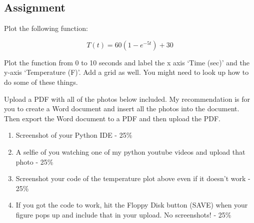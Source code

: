 \subsection{Assignment}

Plot the following function: 

\begin{equation}
  T(t) = 60(1-e^{-5t})+30
\end{equation}

Plot the function from 0 to 10 seconds and label the x axis ‘Time
(sec)’ and the y-axis ‘Temperature (F)’. Add a grid as well. You might
need to look up how to do some of these things.

Upload a PDF with all of the photos below included. My recommendation
is for you to create a Word document and insert all the photos into
the document. Then export the Word document to a PDF and then upload
the PDF. 

\begin{enumerate}[itemsep=-5pt]
  \item Screenshot of your Python IDE - 25\%
  \item A selfie of you watching one of my python youtube videos and upload that photo - 25\%
  \item Screenshot your code of the temperature plot above even if it doesn’t work - 25\%
  \item If you got the code to work, hit the Floppy Disk button (SAVE)
    when your figure pops up and include that in your upload. No screenshots! - 25\%
\end{enumerate}

